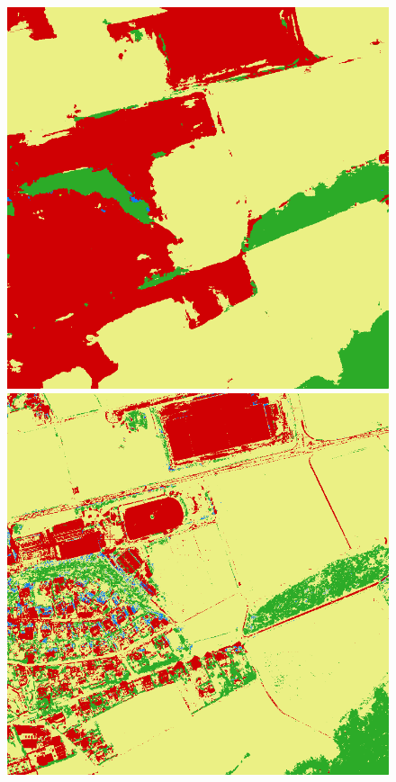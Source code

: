 \begin{figure}
    \includegraphics[width=\DiscussionImageWidth]{images/segmentation_discussion/unet/1.png} \hfill
    \includegraphics[width=\DiscussionImageWidth]{images/segmentation_discussion/densenet/1.png}


\end{figure}
